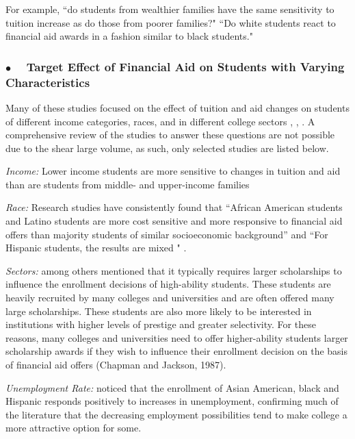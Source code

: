 \documentclass[12pt,english]{report}
\begin{document}
For example, ``do students from wealthier families have the same sensitivity to
tuition increase as do those from poorer families?"  ``Do white students react
to financial aid awards in a fashion similar to black students."

\subsubsection{$\bullet \quad$  Target Effect of Financial Aid on Students with
Varying Characteristics }
Many of these studies focused on the effect of tuition and aid changes on
students of different income categories, races, and in different college
sectors \citep{Jackson1978}, \citep{Braunstein1999}, \citep{Heller1997}.  A
comprehensive review of the studies to answer these questions are not possible
due to the shear large volume, as such, only selected studies are listed below.


\vspace{0.15in}
\noindent \textit{Income: } Lower income students are more sensitive to changes
in tuition and aid than are students from middle- and upper-income families
\citep{Crouse2015}

\vspace{0.25in}
\noindent  \textit{Race: }  Research studies have consistently found that
``African American students and Latino students are more cost sensitive and
more responsive to financial aid offers than majority students of similar
socioeconomic background''  and ``For Hispanic students, the results are mixed
" \citet{Hossler1989}.

\vspace{0.25in}
\noindent \textit{Sectors: }  \citet{Heller1999} among others mentioned that
it typically requires larger scholarships to influence the enrollment decisions
of high-ability students.  These students are heavily recruited by many
colleges and universities and are often offered many large scholarships. These
students are also more likely to be interested in institutions with higher
levels of prestige and greater selectivity.  For these reasons, many colleges
and universities need to offer higher-ability students larger scholarship
awards if they wish to influence their enrollment decision on the basis of
financial aid offers (Chapman and Jackson, 1987).

\vspace{0.25in}
\noindent \textit{Unemployment Rate:}  \citet{Heller1999} noticed that the
enrollment of Asian American, black and Hispanic responds positively to
increases in unemployment, confirming much of the literature that the
decreasing employment possibilities tend to make college a more attractive
option for some.
\end{document}
